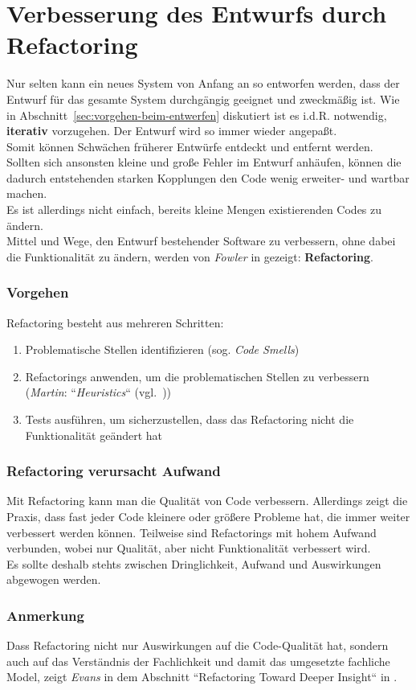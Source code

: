 \section{Verbesserung des Entwurfs durch Refactoring}
Nur selten kann ein neues System von Anfang an so entworfen werden, dass der Entwurf für das gesamte System  durchgängig geeignet und zweckmäßig ist.
Wie in Abschnitt~\ref{sec:vorgehen-beim-entwerfen} diskutiert ist es i.d.R. notwendig, \textbf{iterativ} vorzugehen.
Der Entwurf wird so immer wieder angepaßt.\\
Somit können Schwächen früherer Entwürfe entdeckt und entfernt werden.\\
Sollten sich ansonsten kleine und große Fehler im Entwurf anhäufen, können die dadurch entstehenden starken Kopplungen den Code wenig erweiter- und wartbar machen.\\

\noindent
Es ist allerdings nicht einfach, bereits kleine Mengen existierenden Codes zu ändern.\\
Mittel und Wege, den Entwurf bestehender Software zu verbessern, ohne dabei die Funktionalität zu ändern, werden von \textit{Fowler} in \cite{Fow99} gezeigt: \textbf{Refactoring}.

\subsubsection*{Vorgehen}
Refactoring besteht aus mehreren Schritten:

\begin{enumerate}
    \item Problematische Stellen identifizieren (sog. \textit{Code Smells})
    \item Refactorings anwenden, um die problematischen Stellen zu verbessern (\textit{Martin}: ``\textit{Heuristics}`` (vgl.~\cite[285 ff.]{Mar08}))
    \item Tests ausführen, um sicherzustellen, dass das Refactoring nicht die Funktionalität geändert hat
\end{enumerate}

\subsubsection*{Refactoring verursacht Aufwand}
Mit Refactoring kann man die Qualität von Code verbessern.
Allerdings zeigt die Praxis, dass fast jeder Code kleinere oder größere Probleme hat, die immer weiter verbessert werden können.
Teilweise sind Refactorings mit hohem Aufwand verbunden, wobei nur Qualität, aber nicht Funktionalität verbessert wird.\\
Es sollte deshalb stehts zwischen Dringlichkeit, Aufwand und Auswirkungen abgewogen werden.

\subsubsection*{Anmerkung}
Dass Refactoring nicht nur Auswirkungen auf die Code-Qualität hat, sondern auch auf das Verständnis der Fachlichkeit und damit das umgesetzte fachliche Model, zeigt \textit{Evans} in dem Abschnitt ``Refactoring Toward Deeper Insight`` in \cite{Eva03}.